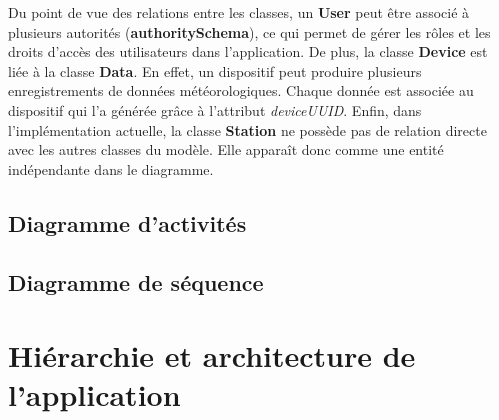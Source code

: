 \noindent Du point de vue des relations entre les classes, un \textbf{User} peut être associé à plusieurs autorités (\textbf{authoritySchema}), ce qui permet de gérer les rôles et les droits d’accès des utilisateurs dans l’application. De plus, la classe \textbf{Device} est liée à la classe \textbf{Data}. En effet, un dispositif peut produire plusieurs enregistrements de données météorologiques. Chaque donnée est associée au dispositif qui l’a générée grâce à l’attribut \textit{deviceUUID}.
Enfin, dans l’implémentation actuelle, la classe \textbf{Station} ne possède pas de relation directe avec les autres classes du modèle. Elle apparaît donc comme une entité indépendante dans le diagramme.

\subsection{Diagramme d’activités}
\subsection{ Diagramme de séquence}


\section{Hiérarchie et architecture de l’application}

